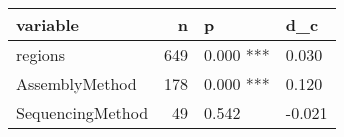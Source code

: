 \begin{table}[ht]
\centering
\begin{tabular}{lrll}
  \hline
variable & n & p & d\_c \\ 
  \hline
regions &  649 & 0.000 *** &  0.030 \\ 
  AssemblyMethod &  178 & 0.000 *** &  0.120 \\ 
  SequencingMethod &   49 & 0.542 & -0.021 \\ 
   \hline
\end{tabular}
\end{table}
